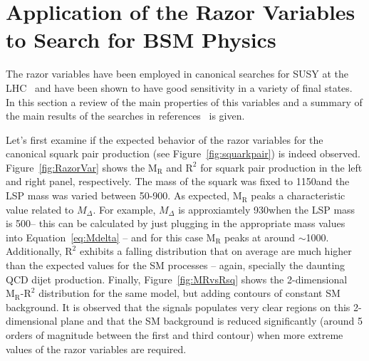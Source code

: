\section{Application of the Razor Variables to Search for BSM Physics}\label{razorApp}

The razor variables have been employed in canonical searches for SUSY
at the LHC~\cite{razor2010,Razor8TeV,Razor13TeV} and have been shown to have good sensitivity in a variety
of final states. In this section a review of the main properties of
this variables and a summary of the main results of the searches in
references~\cite{razor2010,Razor8TeV,Razor13TeV} is given.

Let's first examine if the expected behavior of the razor variables
for the canonical squark pair production (see
Figure~\ref{fig:squarkpair}) is indeed
observed. Figure~\ref{fig:RazorVar} shows the $\mathrm{M_{R}}$ and
$\mathrm{R^{2}}$ for squark pair production in the left and right
panel, respectively. The mass of the squark was fixed to 1150\GeV and
the LSP mass was varied between 50-900\GeV. As expected,
$\mathrm{M_{R}}$ peaks a characteristic value related to
$M_{\Delta}$. For example, $M_{\Delta}$ is approxiamtely 930\GeV when the LSP
mass is 500\GeV -- this can be calculated by just plugging in the appropriate mass values
into Equation~\ref{eq:Mdelta} -- and for this case $\mathrm{M_{R}}$ peaks at around
$\sim$1000\GeV. Additionally, $\mathrm{R^{2}}$ exhibits a falling
distribution that on average are much higher than the expected values
for the SM processes -- again, specially the daunting QCD dijet
production. Finally, Figure~\ref{fig:MRvsRsq} shows the 2-dimensional
$\mathrm{M_{R}}$-$\mathrm{R^{2}}$ distribution for the same model, but
adding contours of constant SM background. It is observed that the
signals populates very clear regions on this 2-dimensional plane and
that the SM background is reduced significantly (around 5 orders of
magnitude between the first and third contour) when more extreme
values of the razor variables are required.
